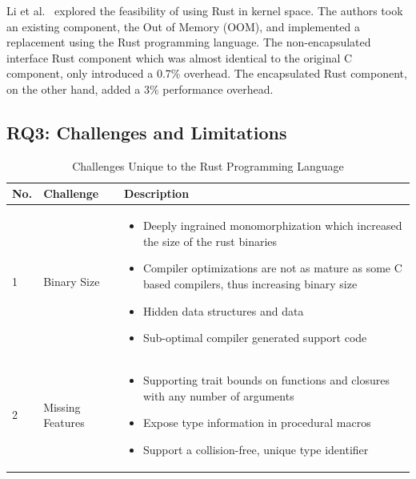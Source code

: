 \documentclass[sigconf]{acmart}
\begin{document}
Li et al.~\cite{Li2024-be} explored the feasibility of using Rust in kernel space. The authors took
an existing component, the Out of Memory (OOM), and implemented a replacement using the Rust
programming language. The non-encapsulated interface Rust component which was almost identical to
the original C component, only introduced a 0.7\% overhead. The encapsulated Rust component, on the
other hand, added a 3\% performance overhead. 



\subsection{RQ3: Challenges and Limitations}

\begin{table}
    \caption{Challenges Unique to the Rust Programming Language}
    \begin{tabular}{p{1cm} p{5cm} p{10cm}}
        \hline
        No. & Challenge & Description\\
        \hline
        1 & Binary Size~\cite{Ayers2022-sf}  &
        \begin{itemize}
            \item Deeply ingrained monomorphization which increased the size of the rust binaries
            \item Compiler optimizations are not as mature as some C based compilers, thus increasing binary size
            \item Hidden data structures and data
            \item Sub-optimal compiler generated support code
        \end{itemize}
        \\
        \hline
        2 & Missing Features~\cite{Burtsev2021-mh} &
        \begin{itemize}
            \item Supporting trait bounds on functions and closures with any number of arguments
            \item Expose type information in procedural macros
            \item Support a collision-free, unique type identifier


\end{itemize}
\end{tabular}
\end{table}
\end{document}
